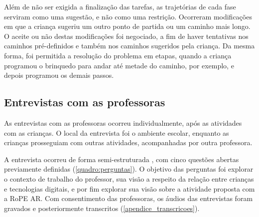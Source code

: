 Além de não ser exigida a finalização das tarefas, as trajetórias de cada fase serviram como uma sugestão, e não como uma restrição. Ocorreram modificações em que a criança sugeriu um outro ponto de partida ou um caminho mais longo. O aceite ou não destas modificações foi negociado, a fim de haver tentativas nos caminhos pré-definidos e também nos caminhos sugeridos pela criança. Da mesma forma, foi permitida a resolução do problema em etapas, quando a criança programou o brinquedo para andar até metade do caminho, por exemplo, e depois programou os demais passos.

\subsection{Entrevistas com as professoras}
As entrevistas com as professoras ocorreu individualmente, após as atividades com as crianças. O local da entrevista foi o ambiente escolar, enquanto as crianças prosseguiam com outras atividades, acompanhadas por outra professora. 

A entrevista ocorreu de forma semi-estruturada \cite{boni_aprendendo_entrevistar_2005}, com cinco questões abertas previamente definidas (\autoref{quadro:perguntas}). O objetivo das perguntas foi explorar o contexto de trabalho do professor, sua visão a respeito da relação entre crianças e tecnologias digitais, e por fim explorar sua visão sobre a atividade proposta com a RoPE AR. Com consentimento das professoras, os áudios das entrevistas foram gravados e posteriormente transcritos (\autoref{apendice_transcricoes}).

